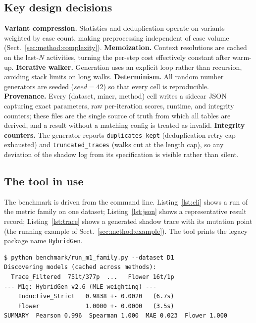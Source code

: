 \documentclass[runningheads]{llncs}
\begin{document}
\subsection{Key design decisions}
\label{sec:impl:decisions}
\textbf{Variant compression.} Statistics and deduplication operate on variants weighted by case count, making preprocessing independent of case volume (Sect.~\ref{sec:method:complexity}). \textbf{Memoization.} Context resolutions are cached on the last-$N$ activities, turning the per-step cost effectively constant after warm-up. \textbf{Iterative walker.} Generation uses an explicit loop rather than recursion, avoiding stack limits on long walks. \textbf{Determinism.} All random number generators are seeded ($\mathit{seed}{=}42$) so that every cell is reproducible. \textbf{Provenance.} Every (dataset, miner, method) cell writes a sidecar JSON capturing exact parameters, raw per-iteration scores, runtime, and integrity counters; these files are the single source of truth from which all tables are derived, and a result without a matching config is treated as invalid. \textbf{Integrity counters.} The generator reports \texttt{duplicates\_kept} (deduplication retry cap exhausted) and \texttt{truncated\_traces} (walks cut at the length cap), so any deviation of the shadow log from its specification is visible rather than silent.

\subsection{The tool in use}
\label{sec:impl:tool}
The benchmark is driven from the command line. Listing~\ref{lst:cli} shows a run of the metric family on one dataset; Listing~\ref{lst:json} shows a representative result record; Listing~\ref{lst:trace} shows a generated shadow trace with its mutation point (the running example of Sect.~\ref{sec:method:example}). The tool prints the legacy package name \texttt{HybridGen}.

\begin{lstlisting}[caption={Running the metric family over all miners on D1.},label={lst:cli}]
$ python benchmark/run_m1_family.py --dataset D1
Discovering models (cached across methods):
  Trace_Filtered  751t/377p  ...   Flower 16t/1p
--- M1g: HybridGen v2.6 (MLE weighting) ---
    Inductive_Strict   0.9838 +- 0.0020   (6.7s)
    Flower             1.0000 +- 0.0000   (3.5s)
SUMMARY  Pearson 0.996  Spearman 1.000  MAE 0.023  Flower 1.000
\end{lstlisting}
\end{document}
